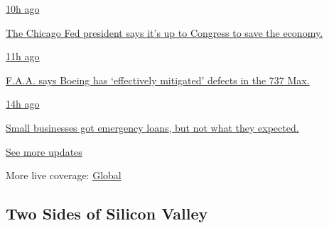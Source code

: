 \href{https://www.nytimes3xbfgragh.onion/live/2020/08/03/business/stock-market-today-coronavirus?action=click\&pgtype=Article\&state=default\&region=MAIN_CONTENT_1\&context=storylines_live_updates\#the-chicago-fed-president-says-its-up-to-congress-to-save-the-economy}{10h
ago}

\href{https://www.nytimes3xbfgragh.onion/live/2020/08/03/business/stock-market-today-coronavirus?action=click\&pgtype=Article\&state=default\&region=MAIN_CONTENT_1\&context=storylines_live_updates\#the-chicago-fed-president-says-its-up-to-congress-to-save-the-economy}{The
Chicago Fed president says it's up to Congress to save the economy.}

\href{https://www.nytimes3xbfgragh.onion/live/2020/08/03/business/stock-market-today-coronavirus?action=click\&pgtype=Article\&state=default\&region=MAIN_CONTENT_1\&context=storylines_live_updates\#faa-says-boeing-has-effectively-mitigated-defects-in-the-737-max}{11h
ago}

\href{https://www.nytimes3xbfgragh.onion/live/2020/08/03/business/stock-market-today-coronavirus?action=click\&pgtype=Article\&state=default\&region=MAIN_CONTENT_1\&context=storylines_live_updates\#faa-says-boeing-has-effectively-mitigated-defects-in-the-737-max}{F.A.A.
says Boeing has `effectively mitigated' defects in the 737 Max.}

\href{https://www.nytimes3xbfgragh.onion/live/2020/08/03/business/stock-market-today-coronavirus?action=click\&pgtype=Article\&state=default\&region=MAIN_CONTENT_1\&context=storylines_live_updates\#small-businesses-got-emergency-loans-but-not-what-they-expected}{14h
ago}

\href{https://www.nytimes3xbfgragh.onion/live/2020/08/03/business/stock-market-today-coronavirus?action=click\&pgtype=Article\&state=default\&region=MAIN_CONTENT_1\&context=storylines_live_updates\#small-businesses-got-emergency-loans-but-not-what-they-expected}{Small
businesses got emergency loans, but not what they expected.}

\href{https://www.nytimes3xbfgragh.onion/live/2020/08/03/business/stock-market-today-coronavirus?action=click\&pgtype=Article\&state=default\&region=MAIN_CONTENT_1\&context=storylines_live_updates}{See
more updates}

More live coverage:
\href{https://www.nytimes3xbfgragh.onion/2020/08/03/world/coronavirus-covid-19.html?action=click\&pgtype=Article\&state=default\&region=MAIN_CONTENT_1\&context=storylines_live_updates}{Global}

\hypertarget{two-sides-of-silicon-valley}{%
\subsection{Two Sides of Silicon
Valley}\label{two-sides-of-silicon-valley}}

